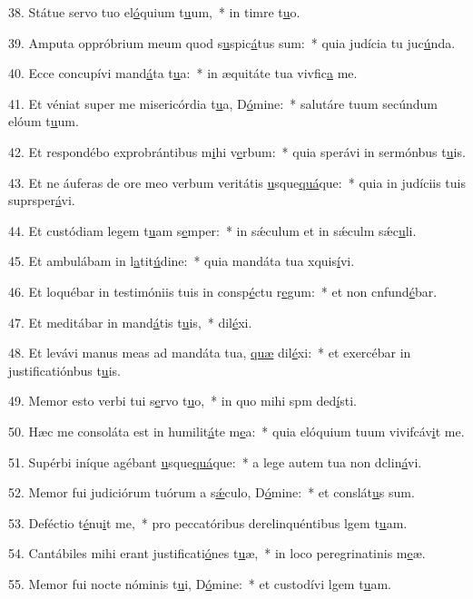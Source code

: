 38. Státue servo tuo el\uline{ó}quium t\uline{u}um,~* in timre t\uline{u}o.\par 
39. Amputa oppróbrium meum quod s\uline{u}spic\uline{á}tus sum:~* quia judícia tu juc\uline{ú}nda.\par 
40. Ecce concupívi mand\uline{á}ta t\uline{u}a:~* in æquitáte tua vivfic\uline{a} me.\par 
41. Et véniat super me misericórdia t\uline{u}a, D\uline{ó}mine:~* salutáre tuum secúndum elóum t\uline{u}um.\par 
42. Et respondébo exprobrántibus m\uline{i}hi v\uline{e}rbum:~* quia sperávi in sermónbus t\uline{u}is.\par 
43. Et ne áuferas de ore meo verbum veritátis \uline{u}sque\uline{quá}que:~* quia in judíciis tuis suprsper\uline{á}vi.\par 
44. Et custódiam legem t\uline{u}am s\uline{e}mper:~* in sǽculum et in sǽculm sǽc\uline{u}li.\par 
45. Et ambulábam in l\uline{a}tit\uline{ú}dine:~* quia mandáta tua xquis\uline{í}vi.\par 
46. Et loquébar in testimóniis tuis in consp\uline{é}ctu r\uline{e}gum:~* et non cnfund\uline{é}bar.\par 
47. Et meditábar in mand\uline{á}tis t\uline{u}is,~*  dil\uline{é}xi.\par 
48. Et levávi manus meas ad mandáta tua, \uline{quæ} dil\uline{é}xi:~* et exercébar in justificatiónbus t\uline{u}is.\par 
49. Memor esto verbi tui s\uline{e}rvo t\uline{u}o,~* in quo mihi spm ded\uline{í}sti.\par 
50. Hæc me consoláta est in humilit\uline{á}te m\uline{e}a:~* quia elóquium tuum vivifcáv\uline{i}t me.\par 
51. Supérbi iníque agébant \uline{u}sque\uline{quá}que:~* a lege autem tua non dclin\uline{á}vi.\par 
52. Memor fui judiciórum tuórum a s\uline{ǽ}culo, D\uline{ó}mine:~* et conslát\uline{u}s sum.\par 
53. Deféctio t\uline{é}nu\uline{i}t me,~* pro peccatóribus derelinquéntibus lgem t\uline{u}am.\par 
54. Cantábiles mihi erant justificati\uline{ó}nes t\uline{u}æ,~* in loco peregrinatinis m\uline{e}æ.\par 
55. Memor fui nocte nóminis t\uline{u}i, D\uline{ó}mine:~* et custodívi lgem t\uline{u}am.\par 
